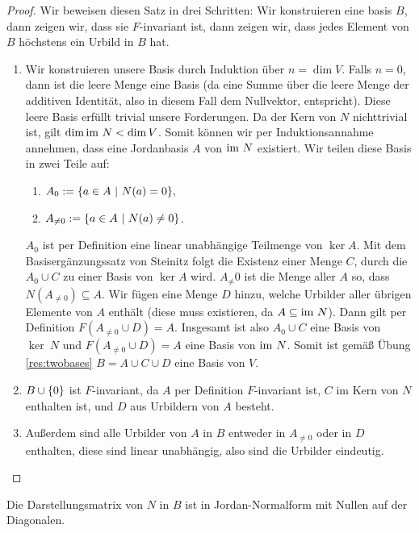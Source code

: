 \documentclass[10pt]{article}
\begin{document}
	\begin{proof}
		Wir beweisen diesen Satz in drei Schritten: Wir konstruieren eine basis $B$, dann zeigen wir, dass sie $F$-invariant ist, dann zeigen wir, dass jedes Element von $B$ höchstens ein Urbild in $B$ hat.
		\begin{enumerate}
			\item  
			Wir konstruieren unsere Basis durch Induktion über $n = \dim V$.
			\newpar
			Falls $n = 0$, dann ist die leere Menge eine Basis (da eine Summe über die leere Menge der additiven Identität, also in diesem Fall dem Nullvektor, entspricht). Diese leere Basis erfüllt trivial unsere Forderungen.
			\newpar
			Da der Kern von $N$ nichttrivial ist, gilt $\dim \textnormal{im}~ N < \dim V$. Somit können wir per Induktionsannahme annehmen, dass eine Jordanbasis $A$ von $\textnormal{im}~ N$ existiert. Wir teilen diese Basis in zwei Teile auf:
			\begin{enumerate}
				\item $A_0 := \qty{a \in A ~\middle|~N(a) = 0},$
				\item $A_{\neq 0} := \qty{a \in A ~\middle|~N(a) \neq 0}$.
			\end{enumerate}
			$A_0$ ist per Definition eine linear unabhängige Teilmenge von $\ker A$. Mit dem Basisergänzungssatz von Steinitz folgt die Existenz einer Menge $C$, durch die $A_0 \cup C$ zu einer Basis von $\ker A$ wird.
			\newpar
			$A_\neq 0$ ist die Menge aller $A$ so, dass $N(A_{\neq 0}) \subseteq A$. Wir fügen eine Menge $D$ hinzu, welche Urbilder aller übrigen Elemente von $A$ enthält (diese muss existieren, da $A \subseteq \textnormal{im}~ N$). Dann gilt per Definition $F(A_{\neq 0} \cup D) = A$.
			\newpar
			Insgesamt ist also $A_0 \cup C$ eine Basis von $\ker~ N$ und $F(A_{\neq 0} \cup D) = A$ eine Basis von $\textnormal{im}~ N$. Somit ist gemäß Übung \ref{res:twobases} $B = A \cup C \cup D$ eine Basis von $V$.
			\item
			$B \cup \qty{0}$ ist $F$-invariant, da $A$ per Definition $F$-invariant ist, $C$ im Kern von $N$ enthalten ist, und $D$ aus Urbildern von $A$ besteht.
			\item
			Außerdem sind alle Urbilder von $A$ in $B$ entweder in $A_{\neq 0}$ oder in $D$ enthalten, diese sind linear unabhängig, also sind die Urbilder eindeutig.
		\end{enumerate}
	\end{proof}
	\begin{exercise}
		\label{cor:nilpotentjordan}
		Die Darstellungsmatrix von $N$ in $B$ ist in Jordan-Normalform mit Nullen auf der Diagonalen.
	\end{exercise}
\end{document}
